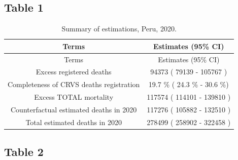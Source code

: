 \documentclass[
]{article}
\begin{document}
\hypertarget{table-1}{%
\subsection{Table 1}\label{table-1}}

\begin{longtable}[]{@{}cc@{}}
\caption{\label{tab:summary} Summary of estimations, Peru, 2020.}\tabularnewline
\toprule
Terms & Estimates (95\% CI) \\
\midrule
\endfirsthead
\toprule
Terms & Estimates (95\% CI) \\
\midrule
\endhead
Excess registered deaths & 94373 ( 79139 - 105767 ) \\
Completeness of CRVS deaths registration & 19.7 \% ( 24.3 \% - 30.6 \%) \\
Excess TOTAL mortality & 117574 ( 114101 - 139810 ) \\
Counterfactual estimated deaths in 2020 & 117276 ( 105882 - 132510 ) \\
Total estimated deaths in 2020 & 278499 ( 258902 - 322458 ) \\
\bottomrule
\end{longtable}

\hypertarget{table-2}{%
\subsection{Table 2}\label{table-2}}
\end{document}
